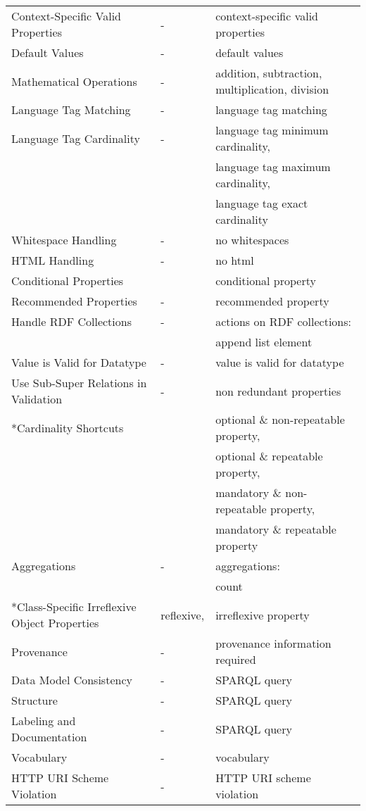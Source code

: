 \documentclass{llncs}
\begin{document}
\begin{table}[H]
\begin{center}
\begin{tabular}{lll}
Context-Specific Valid Properties & - & context-specific valid properties \\
Default Values & - & default values \\
Mathematical Operations & - & addition, subtraction, multiplication, division \\
Language Tag Matching & - & language tag matching \\
Language Tag Cardinality & - & language tag minimum cardinality, \\
                            && language tag maximum cardinality, \\
													  && language tag exact cardinality \\
Whitespace Handling & - & no whitespaces \\
HTML Handling & - & no html \\
Conditional Properties &  & conditional property \\
Recommended Properties & - & recommended property \\
Handle RDF Collections & - & actions on RDF collections: \\
                          && append list element \\
Value is Valid for Datatype & - & value is valid for datatype \\
Use Sub-Super Relations in Validation & - & non redundant properties \\
*Cardinality Shortcuts & & optional \& non-repeatable property, \\
                       & & optional \& repeatable property, \\
											 & & mandatory \& non-repeatable property, \\
											 & & mandatory \& repeatable property \\
Aggregations & - & aggregations: \\
                 && count \\
*Class-Specific Irreflexive Object Properties & reflexive,  & irreflexive property \\
Provenance & - & provenance information required \\   
Data Model Consistency & - & SPARQL query \\    
Structure & - & SPARQL query \\  
Labeling and Documentation & - & SPARQL query \\   
Vocabulary & - & vocabulary \\  
HTTP URI Scheme Violation & - & HTTP URI scheme violation \\   
		
    \bottomrule
    \end{tabular}
    \end{center}
\end{table}
\end{document}
